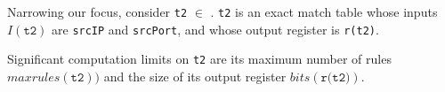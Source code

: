 Narrowing our focus, consider \texttt{t2} $\in$ \exampledp. \texttt{t2} is an exact match table whose inputs $I(\texttt{t2})$ are \texttt{srcIP} and \texttt{srcPort}, and whose output register is \texttt{r(t2)}. %

Significant computation limits on \texttt{t2} are its maximum number of rules $maxrules(\texttt{t2}))$ and the size of its output register $bits(\texttt{r(t2)})$.






